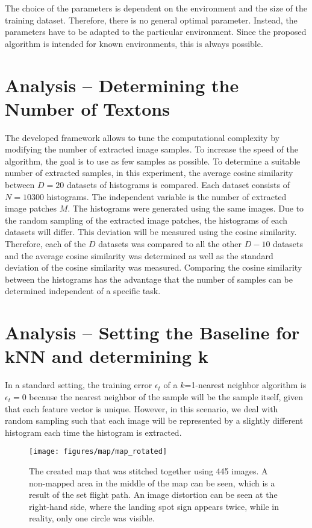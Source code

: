 \documentclass{report}
\begin{document}
The choice of the parameters is dependent on the environment and the
size of the training dataset. Therefore, there is no general optimal
parameter. Instead, the parameters have to be adapted to the
particular environment. Since the proposed algorithm is intended for
known environments, this is always possible.

\section{Analysis -- Determining the Number of Textons}
\label{sec:numtextons}

The developed framework allows to tune the computational complexity by
modifying the number of extracted image samples. To increase the speed
of the algorithm, the goal is to use as few samples as possible. To
determine a suitable number of extracted samples, in this experiment,
the average cosine similarity between $D = 20$ datasets of histograms
is compared. Each dataset consists of $N = 10300$ histograms. The
independent variable is the number of extracted image patches $M$. The
histograms were generated using the same images. Due to the random
sampling of the extracted image patches, the histograms of each
datasets will differ. This deviation will be measured using the cosine
similarity. Therefore, each of the $D$ datasets was compared to all
the other $D - 10$ datasets and the average cosine similarity was
determined as well as the standard deviation of the cosine similarity
was measured. Comparing the cosine similarity between the histograms
has the advantage that the number of samples can be determined
independent of a specific task.

\section{Analysis -- Setting the Baseline for kNN and determining k}
\label{sec:numtextons}

In a standard setting, the training error $\epsilon_t$ of a
$k$=1-nearest neighbor algorithm is $\epsilon_t = 0$ because the
nearest neighbor of the sample will be the sample itself, given that
each feature vector is unique. However, in this scenario, we deal with
random sampling such that each image will be represented by a slightly
different histogram each time the histogram is extracted.

\begin{figure}[h!]
\begin{center}
\texttt{[image: figures/map/map\_rotated]}
\caption{{\label{fig:mapexp} The created map that was stitched
    together using 445 images. A non-mapped area in the middle of the
    map can be seen, which is a result of the set flight path. An
    image distortion can be seen at the right-hand side, where the
    landing spot sign appears twice, while in reality, only one circle
    was visible.%
  }}
\end{center}
\end{figure}
\end{document}
